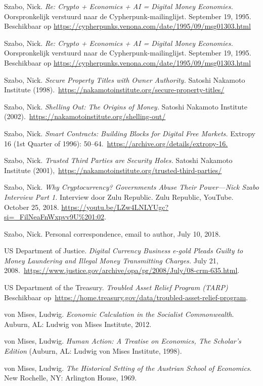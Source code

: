 \documentclass[
  a5paper,
  smalldemyvopaper,11pt,twoside,onecolumn,openright,extrafontsizes,
hidelinks]{memoir}
\begin{document}
{Szabo, Nick. \emph{Re: Crypto + Economics + AI = Digital Money
Economies.} Oorspronkelijk verstuurd naar de Cypherpunk-mailinglijst.
September 19, 1995. Beschikbaar op
\url{https://cypherpunks.venona.com/date/1995/09/msg01303.html}

Szabo, Nick. \emph{Re: Crypto + Economics + AI = Digital Money
Economies.} Oorspronkelijk verstuurd naar de Cypherpunk-mailinglijst.
September 19, 1995. Beschikbaar op
\url{https://cypherpunks.venona.com/date/1995/09/msg01303.html}

Szabo, Nick. \emph{Secure Property Titles with Owner Authority.} Satoshi
Nakamoto Institute
(1998).~\url{https://nakamotoinstitute.org/secure-property-titles/}

Szabo, Nick. \emph{Shelling Out: The Origins of Money.} Satoshi Nakamoto
Institute (2002).~\url{https://nakamotoinstitute.org/shelling-out/}

Szabo, Nick. \emph{Smart Contracts: Building Blocks for Digital Free
Markets.} Extropy 16 (1st Quarter of 1996):
50--64.~\url{https://archive.org/details/extropy-16.}

Szabo, Nick. \emph{Trusted Third Parties are Security Holes.} Satoshi
Nakamoto Institute
(2001),~\url{https://nakamotoinstitute.org/trusted-third-parties/}

Szabo, Nick. \emph{Why Cryptocurrency? Governments Abuse Their
Power---Nick Szabo Interview Part 1.} Interview door Zulu Republic. Zulu
Republic, YouTube. October 25, 2018.
\url{https://youtu.be/LZw4LNLYUgc?si=_FilNeaFnWxpvv9U\%201:02}.

Szabo, Nick. Personal correspondence, email to author, July 10, 2018.

US Department of Justice. \emph{Digital Currency Business e-gold Pleads
Guilty to Money Laundering and Illegal Money Transmitting Charges.} July
21,
2008.~\url{https://www.justice.gov/archive/opa/pr/2008/July/08-crm-635.html}.

US Department of the Treasury. \emph{Troubled Asset Relief Program
(TARP)} Beschikbaar
op~\url{https://home.treasury.gov/data/troubled-asset-relief-program}.

von Mises, Ludwig. \emph{Economic Calculation in the Socialist
Commonwealth}. Auburn, AL: Ludwig von Mises Institute, 2012.

von Mises, Ludwig. \emph{Human Action: A Treatise on Economics, The
Scholar's Edition} (Auburn, AL: Ludwig von Mises Institute, 1998).

von Mises, Ludwig. \emph{The Historical Setting of the Austrian School
of Economics}. New Rochelle, NY: Arlington House, 1969.

}
\end{document}
